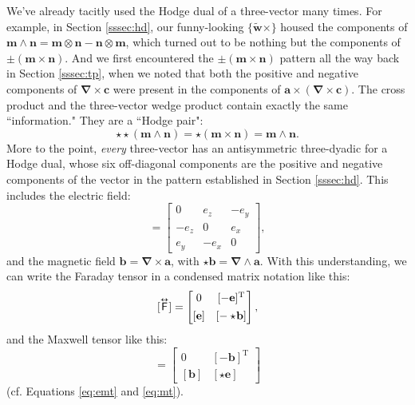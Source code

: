 \documentclass[12pt]{article}
\renewcommand{\vv}[1]{\mathbf{#1}}
\newcommand{\del}{\boldsymbol{\nabla}}
\newcommand{\capdy}[1]{ \overset{ \text{\tiny$\bm\leftrightarrow$} }{\vphantom{\text{\small{A}}}\smash{#1}} }
\begin{document}
We've already tacitly used the Hodge dual of a three-vector many times. For example, in Section \ref{sssec:hd}, our funny-looking $\{ \tilde{\vv w} \times \}$ housed the components of ${ \vv m \wedge \vv n = \vv m \otimes \vv n - \vv n \otimes \vv m }$, which turned out to be nothing but the components of $\pm ( \vv m \times \vv n )$. And we first encountered the $\pm ( \vv m \times \vv n )$ pattern all the way back in Section \ref{sssec:tp}, when we noted that both the positive and negative components of $\del \times \vv c$ were present in the components of $\vv a \times ( \del \times \vv c )$. The cross product and the three-vector wedge product contain exactly the same ``information." They are a ``Hodge pair":
\begin{equation*}
\star \star ( \vv m \wedge \vv n ) = \star ( \vv m \times \vv n ) = \vv m \wedge \vv n . 
\end{equation*}
More to the point, \emph{every} three-vector has an antisymmetric three-dyadic for a Hodge dual, whose six off-diagonal components are the positive and negative components of the vector in the pattern established in Section \ref{sssec:hd}. This includes the electric field:
\begin{equation*}
[ \star \vv e ]
=
\begin{bmatrix}
0 & e_z & -e_y \\
-e_z & 0 & e_x \\
e_y & -e_x & 0
\end{bmatrix} ,
\end{equation*}
and the magnetic field $\vv b = \del \times \vv a$, with $\star \vv b = \del \wedge \vv a$. With this understanding, we can write the Faraday tensor in a condensed matrix notation like this:
\begin{equation}\label{eq:ftc}
[ \capdy{\mathsf{F}} ]
=
\begin{bmatrix}
0 & [ - \vv e ]^\mathrm{T} \\[1ex]
[ \vv e ] & [ - \star \mkern-3mu \vv b ]
\end{bmatrix} ,
\end{equation}
and the Maxwell tensor like this:
\begin{equation*}
[ \capdy{\mathsf{G}} ]
=
\begin{bmatrix}
0 & [ - \vv b ]^\mathrm{T} \\[1ex]
[ \vv b ] & [ \star \vv e ]
\end{bmatrix}
\end{equation*}
(cf. Equations \ref{eq:emt} and \ref{eq:mt}).
\end{document}
